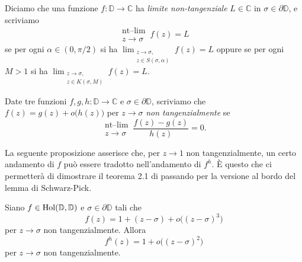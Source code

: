 \begin{defn}
  Diciamo che una funzione $f:\mathbb{D} \longrightarrow \mathbb{C}$ ha \textit{limite non-tangenziale} $L \in \mathbb{C}$ in $\sigma \in \partial\mathbb{D}$, e scriviamo
  $$\substack{\text{nt--lim} \\ z \longrightarrow \sigma} \, f(z)=L$$
  se per ogni $\alpha \in (0,\pi/2)$ si ha $\displaystyle \lim_{\substack{z \longrightarrow \sigma, \\ z \in S(\sigma,\alpha)}} f(z)=L$ oppure se per ogni $M>1$ si ha $\displaystyle \lim_{\substack{z \longrightarrow \sigma, \\ z \in K(\sigma,M)}} f(z)=L$.
\end{defn}

\begin{defn}
  Date tre funzioni $f,g,h: \mathbb{D} \longrightarrow \mathbb{C}$ e $\sigma \in \partial \mathbb{D}$, scriviamo che $f(z)=g(z)+o\bigl(h(z)\bigr)$ per $z \longrightarrow \sigma$ \textit{non tangenzialmente} se
  $$\substack{\text{nt--lim} \\ z \longrightarrow \sigma} \, \frac{f(z)-g(z)}{h(z)}=0.$$
\end{defn}

La seguente proposizione asserisce che, per $z \longrightarrow 1$ non tangenzialmente, un certo andamento di $f$ può essere tradotto nell'andamento di $f^h$. È questo che ci permetterà di dimostrare il teorema 2.1 di \cite{BK} passando per la versione al bordo del lemma di Schwarz-Pick.

\begin{prop} \label{o^3->o^2}
  Siano $f \in \text{\normalfont{Hol}}(\mathbb{D},\mathbb{D})$ e $\sigma \in \partial\mathbb{D}$ tali che
  \begin{equation} \label{o^3}
    f(z)=1+(z-\sigma)+o\bigl((z-\sigma)^3\bigr)
  \end{equation}
  per $z \longrightarrow \sigma$ non tangenzialmente. Allora
  \begin{equation} \label{o^2}
    f^h(z)=1+o\bigl((z-\sigma)^2\bigr)
  \end{equation}
  per $z \longrightarrow \sigma$ non tangenzialmente.
\end{prop}

